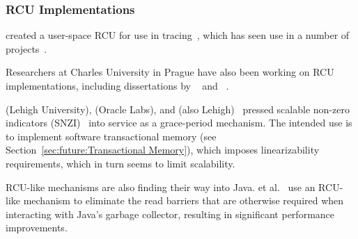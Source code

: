 \iffalse

\ppl{Maya}{Arbel} and \ppl{Hagit}{Attiya} of Technion took a more rigorous
approach~\cite{MayaArbel2014RCUtree} to an RCU-protected search tree that,
like Masstree, allows concurrent updates.
This paper includes a proof of correctness, including proof that all
operations on this tree are linearizable.
Unfortunately, this implementation achieves linearizability by incurring
the full latency of grace-period waits while holding locks, which degrades
scalability of update-only workloads.
One way around this problem is to abandon
linearizability~\cite{AndreasHaas2012FIFOisnt,PaulEMcKennneyAtomicTreeN4037},
however, Arbel and Attiya instead created an RCU variant that reduces
low-end grace-period latency.
Of course, nothing comes for free, and this RCU variant appears to hit
a scalability limit at about 32 CPUs.
Although there is much to be said for dropping linearizability, thus
gaining both performance and scalability, it is very good to see academics
experimenting with alternative RCU implementations.

\fi

\subsubsection{RCU Implementations}
\label{sec:defer:RCU Implementations}

 created a user-space RCU for use in
tracing~\cite{MathieuDesnoyers2009URCU,MathieuDesnoyersPhD,MathieuDesnoyers2012URCU},
which has seen use in a number of projects~\cite{MikeDay2013RCUqemu}.

Researchers at Charles University in Prague have also been
working on RCU implementations, including dissertations by
~\cite{AndrejPodzimek2010masters} and
~\cite{AdamHraska2013RCUHelenOS}.

 (Lehigh University),  (Oracle Labs), and
 (also Lehigh)~\cite{Liu:2013:MSA:2549695.2549732}
pressed scalable non-zero indicators
(SNZI)~\cite{FaithEllen:2007:SNZI} into service as a grace-period
mechanism.
The intended use is to implement software transactional memory
(see Section~\ref{sec:future:Transactional Memory}), which
imposes linearizability requirements, which in turn seems to
limit scalability.

RCU-like mechanisms are also finding their way into Java.
 et al.~\cite{Sivaramakrishnan:2012:ERB:2258996.2259005}
use an RCU-like mechanism to eliminate the read barriers that are
otherwise required when interacting with Java's garbage collector,
resulting in significant performance improvements.


